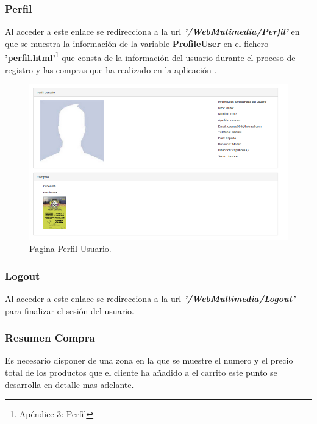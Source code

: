 \subsubsection*{Perfil}
Al acceder a este enlace se redirecciona a la url \textbf{\textit{'/WebMutimedia/Perfil'}} en que se muestra la información de la variable \textbf{ProfileUser} en el fichero \textbf{'perfil.html'}\footnote{Apéndice 3: Perfil} que consta de la información del usuario durante el proceso de registro y las compras que ha realizado en la aplicación .
\begin{figure}[!h]
\begin{center}
   \includegraphics[width=0.5\linewidth]{Figures/ProfileUser}
	\decoRule
	\caption[Perfil Usuario]{Pagina Perfil Usuario.}
\label{fig:Perfil_user}
\end{center}
\end{figure}
\subsubsection*{Logout}
Al acceder a este enlace se redirecciona a la url \textbf{\textit{'/WebMultimedia/Logout'}} para finalizar el sesión del usuario.
\subsubsection*{Resumen Compra}
Es necesario disponer de una zona en la que se muestre el numero y el precio total de los productos que el cliente ha añadido a el carrito este punto se desarrolla en detalle mas adelante.
